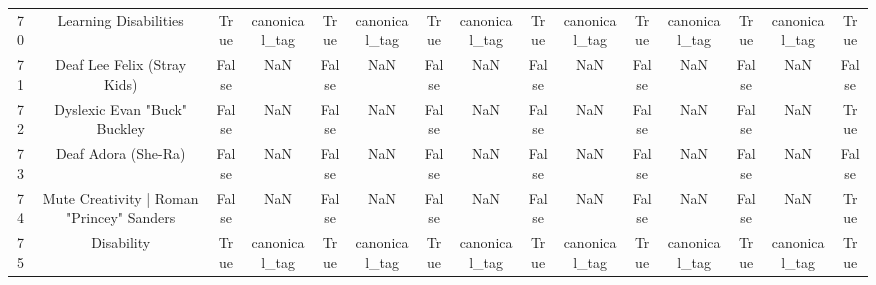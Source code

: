 \begin{table}[h!]
{\begin{tabular}{|c|c|c|c|c|c|c|c|c|c|c|c|c|c|c|}
         70 &                             Learning Disabilities &                           True &             canonical\_tag &                           True &             canonical\_tag &                           True &             canonical\_tag &                           True &             canonical\_tag &                           True &             canonical\_tag &                           True &             canonical\_tag &                           True \\
         71 &                       Deaf Lee Felix (Stray Kids) &                          False &                       NaN &                          False &                       NaN &                          False &                       NaN &                          False &                       NaN &                          False &                       NaN &                          False &                       NaN &                          False \\
         72 &                      Dyslexic Evan "Buck" Buckley &                          False &                       NaN &                          False &                       NaN &                          False &                       NaN &                          False &                       NaN &                          False &                       NaN &                          False &                       NaN &                           True \\
         73 &                               Deaf Adora (She-Ra) &                          False &                       NaN &                          False &                       NaN &                          False &                       NaN &                          False &                       NaN &                          False &                       NaN &                          False &                       NaN &                          False \\
         74 &         Mute Creativity | Roman "Princey" Sanders &                          False &                       NaN &                          False &                       NaN &                          False &                       NaN &                          False &                       NaN &                          False &                       NaN &                          False &                       NaN &                           True \\
         75 &                                        Disability &                           True &             canonical\_tag &                           True &             canonical\_tag &                           True &             canonical\_tag &                           True &             canonical\_tag &                           True &             canonical\_tag &                           True &             canonical\_tag &                           True \\

\end{tabular}}
\end{table}
